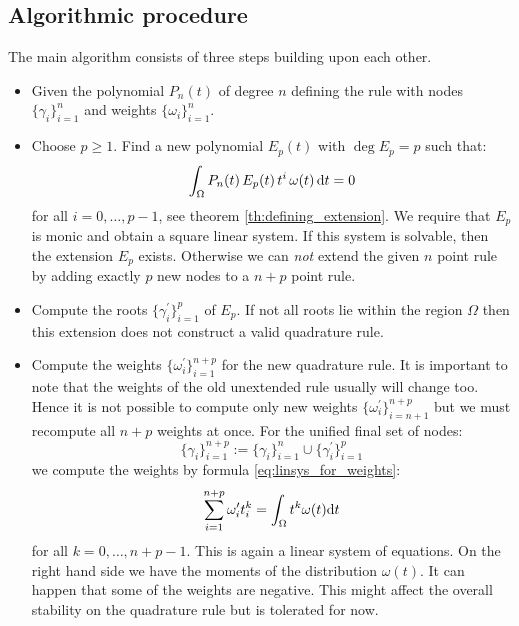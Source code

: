 \documentclass[a4paper,10pt]{article}
\begin{document}
\FloatBarrier
\subsection{Algorithmic procedure}

The main algorithm consists of three steps building upon each other.

\begin{itemize}
  \item Given the polynomial $P_n(t)$ of degree $n$ defining the rule
    with nodes $\{\gamma_i\}_{i=1}^{n}$ and weights $\{\omega_i\}_{i=1}^{n}$.
  \item Choose $p \geq 1$.
    Find a new polynomial $E_p(t)$ with $\deg E_p = p$ such that:
    \begin{equation}
      \int_{\Omega} P_n(t) \, E_p(t) \, t^i \, \omega(t) \, \mathrm{d}t = 0
    \end{equation}
    for all $i = 0, \ldots, p-1$, see theorem \ref{th:defining_extension}.
    We require that $E_p$ is monic and obtain a square linear system.
    If this system is solvable, then the extension $E_p$ exists.
    Otherwise we can \emph{not} extend the given $n$ point rule by
    adding exactly $p$ new nodes to a $n+p$ point rule.
  \item Compute the roots $\{\gamma^\prime_i\}_{i=1}^{p}$ of $E_p$.
    If not all roots lie within the region $\Omega$ then this extension
    does not construct a valid quadrature rule.
  \item Compute the weights $\{\omega^\prime_i\}_{i=1}^{n+p}$ for the new
    quadrature rule. It is important to note that the weights of the old
    unextended rule usually will change too. Hence it is not possible to
    compute only new weights $\{\omega^\prime_i\}_{i=n+1}^{n+p}$ but we must
    recompute all $n+p$ weights at once. For the unified final set of nodes:
    \begin{equation}
      \{\gamma_i\}_{i=1}^{n+p} := \{\gamma_i\}_{i=1}^{n} \cup \{\gamma^\prime_i\}_{i=1}^{p}
    \end{equation}
    we compute the weights by formula \eqref{eq:linsys_for_weights}:
    \begin{equation}
      \sum_{i=1}^{n+p} \omega^\prime_i t_i^k = \int_{\Omega} t^k \omega(t) \mathrm{d}t
    \end{equation}
    for all $k=0, \ldots, n+p-1$. This is again a linear system
    of equations. On the right hand side we have the moments of the
    distribution $\omega(t)$. It can happen that some of the weights
    are negative. This might affect the overall stability on the quadrature
    rule but is tolerated for now.
\end{itemize}
\end{document}
